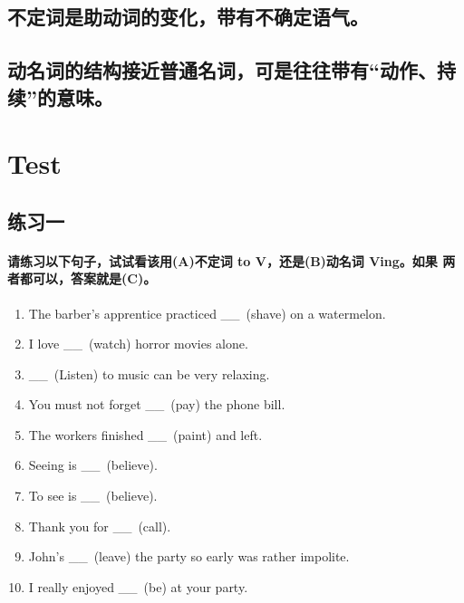 \documentclass{yufa}
\newcommand\ttu{ \_\_\ }
\begin{document}
\subsection{不定词是助动词的变化，带有不确定语气。}
\subsection{动名词的结构接近普通名词，可是往往带有“动作、持续”的意味。}

\section{Test}

\subsection{练习一}

\paragraph{请练习以下句子，试试看该用(A)不定词 to V，还是(B)动名词 Ving。如果
  两者都可以，答案就是(C)。}

\begin{enumerate}
\item The barber's apprentice practiced \ttu (shave) on a watermelon.

\item I love \ttu (watch) horror movies alone.

\item \ttu (Listen) to music can be very relaxing.

\item You must not forget \ttu (pay) the phone bill.

\item The workers finished \ttu (paint) and left.

\item Seeing is \ttu (believe).

\item To see is \ttu (believe).

\item Thank you for \ttu (call).

\item John's \ttu (leave) the party so early was rather impolite.

\item I really enjoyed \ttu (be) at your party.
\end{enumerate}
\end{document}

